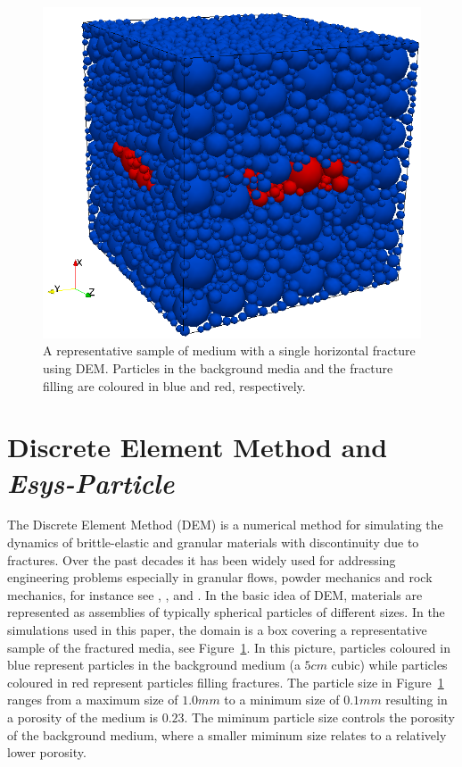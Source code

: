 \documentclass[review,authoryear]{elsarticle}
\newcommand{\esysparticle}{\textit{Esys-Particle }}
\begin{document}
\begin{figure}[t]
\centering
\includegraphics[scale=0.2]{./figures/particle.jpg}
\caption{A representative sample of medium with a single horizontal fracture using DEM. 
Particles in the background media and the fracture filling are coloured in blue and red, respectively.\label{FIG:particle}}
\end{figure}


\section{Discrete Element Method and \esysparticle}
The Discrete Element Method (DEM) \citep{cundall1979discrete} is a numerical method for simulating the dynamics of brittle-elastic and 
granular materials with discontinuity due to fractures. Over the past decades it has been widely used for addressing engineering problems especially in granular flows, powder mechanics and rock mechanics, for instance see \cite{pande1990numerical}, \cite{langston1995discrete}, \cite{martin2003study} and \cite{jing2007fundamentals}. 
In the basic idea of DEM, materials are represented as assemblies of typically spherical particles of different sizes. 
In the simulations used in this paper, the domain is a box covering a representative sample of the fractured media, see Figure~\ref{FIG:particle}. 
In this picture, particles coloured in blue represent particles in the background medium (a $5 cm$ cubic) while particles coloured in red represent particles filling fractures. The particle size in Figure~\ref{FIG:particle} ranges from a maximum size of $1.0 mm$ to a minimum size of $0.1mm$ resulting in a porosity of the medium is $0.23$. 
The miminum particle size controls the porosity of the background medium, where a smaller miminum size relates to a relatively lower porosity. 
\end{document}
